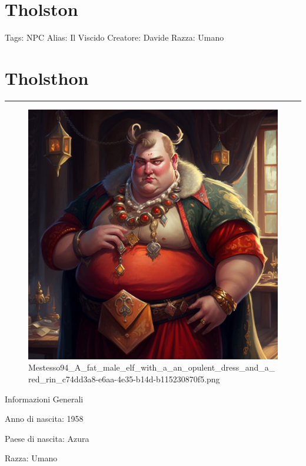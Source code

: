 \section{Tholston}\label{tholston}

Tags: NPC Alias: Il Viscido Creatore: Davide Razza: Umano

\section{Tholsthon}\label{tholsthon}

\begin{center}\rule{0.5\linewidth}{0.5pt}\end{center}

\begin{figure}
\centering
\includegraphics{Mestesso94_A_fat_male_elf_with_a_an_opulent_dress_and_a_red_rin_c74dd3a8-e6aa-4e35-b14d-b115230870f5.png}
\caption{Mestesso94\_A\_fat\_male\_elf\_with\_a\_an\_opulent\_dress\_and\_a\_red\_rin\_c74dd3a8-e6aa-4e35-b14d-b115230870f5.png}
\end{figure}

Informazioni Generali

Anno di nascita: 1958

Paese di nascita: Azura

Razza: Umano

